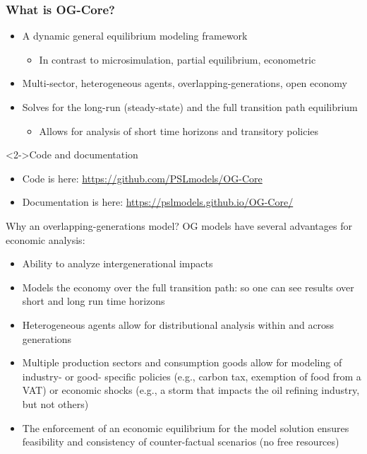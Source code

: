 \documentclass{beamer}
\begin{document}
  \begin{frame}
    \frametitle{What is OG-Core?}
    \begin{itemize}
      \item A dynamic general equilibrium modeling framework
      \vspace{1mm}
      \begin{itemize}
        \item In contrast to microsimulation, partial equilibrium, econometric
      \end{itemize}
      \vspace{1mm}
      \item Multi-sector, heterogeneous agents, overlapping-generations, open economy
      \vspace{1mm}
      \item Solves for the long-run (steady-state) and the full transition path equilibrium
      \vspace{1mm}
      \begin{itemize}
          \item Allows for analysis of short time horizons and transitory policies
      \end{itemize}
    \end{itemize}
    \begin{block}<2->{Code and documentation}
      \begin{itemize}
        \item Code is here: \href{https://github.com/PSLmodels/OG-Core}{https://github.com/PSLmodels/OG-Core}
        \item Documentation is here: \href{https://pslmodels.github.io/OG-Core/content/intro/intro.html}{https://pslmodels.github.io/OG-Core/}
      \end{itemize}
    \end{block}
  \end{frame}

  \begin{frame}{Why an overlapping-generations model?}
  OG models have several advantages for economic analysis:
  \begin{itemize}
      \item Ability to analyze intergenerational impacts
      \item Models the economy over the full transition path: so one can see results over short and long run time horizons
      \item Heterogeneous agents allow for distributional analysis within and across generations
      \item Multiple production sectors and consumption goods allow for modeling of industry- or good- specific policies (e.g., carbon tax, exemption of food from a VAT) or economic shocks (e.g., a storm that impacts the oil refining industry, but not others)
      \item The enforcement of an economic equilibrium for the model solution ensures feasibility and consistency of counter-factual scenarios (no free resources)
  \end{itemize}
  \end{frame}
\end{document}
